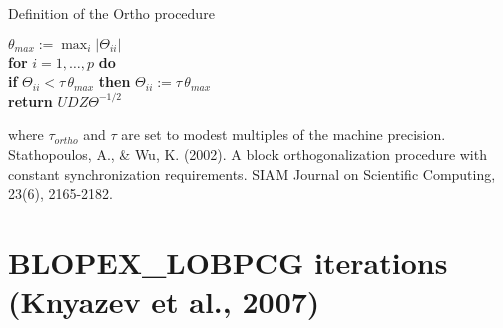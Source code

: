 \documentclass[t,usepdftitle=false]{beamer}
\begin{document}
\begin{frame}{Definition of the Ortho procedure}
\begin{itemize}
\begin{minipage}{.55\framewidth}
\begin{center}
{\begin{varwidth}{17cm}
$\theta_{max}:=\max_{i}|\Theta_{ii}|$\tinyskip\\
\textbf{for} $i=1,\dots,p$ \textbf{do}\tinyskip\\
\hspace*{.4cm}\textbf{if} $\Theta_{ii}<\tau\,\theta_{max}$ \textbf{then} $\Theta_{ii}:=\tau\,\theta_{max}$ \tinyskip\\
\textbf{return} $UDZ\Theta^{-1/2}$
\end{varwidth}}\end{center}
\end{minipage}
\end{itemize}
\medskip
where $\tau_{ortho}$ and $\tau$ are set to modest multiples of the machine precision.\smallskip\\
\smallskip
\tiny{Stathopoulos, A., \& Wu, K. (2002). A block orthogonalization procedure with constant synchronization requirements. SIAM Journal on Scientific Computing, 23(6), 2165-2182.}
\end{frame}

\section{BLOPEX\_LOBPCG iterations (Knyazev et al., 2007)}
\end{document}
